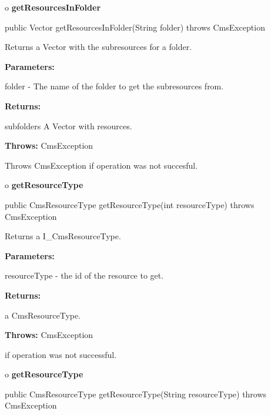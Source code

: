 o {\bf getResourcesInFolder} 

\begin{PRE}
 public Vector getResourcesInFolder(String folder) throws CmsException
\end{PRE}

\begin{description}
\htmlDD Returns a Vector with the subresources for a folder.\htmlBR

\begin{description}
\item {\bf Parameters:}  

folder - The name of the folder to get the subresources from.  
\item {\bf Returns:}  

subfolders A Vector with resources.  
\item {\bf Throws:} CmsException  

Throws CmsException if operation was not succesful.  
\end{description}

\end{description}

o {\bf getResourceType} 

\begin{PRE}
 public CmsResourceType getResourceType(int resourceType) throws CmsException
\end{PRE}

\begin{description}
\htmlDD Returns a I\_CmsResourceType. 

\begin{description}
\item {\bf Parameters:}  

resourceType - the id of the resource to get.  
\item {\bf Returns:}  

a CmsResourceType.  
\item {\bf Throws:} CmsException  

if operation was not successful.  
\end{description}

\end{description}

o {\bf getResourceType} 

\begin{PRE}
 public CmsResourceType getResourceType(String resourceType) throws CmsException
\end{PRE}

